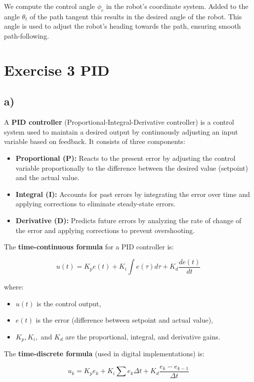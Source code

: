 \documentclass[template,12pt,a4paper,enabledeprecatedfontcommands]{template}
\begin{document}
We compute the control angle $\phi_c$ in the robot’s coordinate system. Added to the angle $\theta_t$ of the path tangent this results in the desired angle of the robot. This angle is used to adjust the robot's heading towards the path, ensuring smooth path-following.

\section{Exercise 3 PID}

\subsection*{a)}
A \textbf{PID controller} (Proportional-Integral-Derivative controller) is a control system used to maintain a desired output by continuously adjusting an input variable based on feedback. It consists of three components:

\begin{itemize}
    \item \textbf{Proportional (P):} Reacts to the present error by adjusting the control variable proportionally to the difference between the desired value (setpoint) and the actual value.
    \item \textbf{Integral (I):} Accounts for past errors by integrating the error over time and applying corrections to eliminate steady-state errors.
    \item \textbf{Derivative (D):} Predicts future errors by analyzing the rate of change of the error and applying corrections to prevent overshooting.
\end{itemize}

The \textbf{time-continuous formula} for a PID controller is:

\[
u(t) = K_p e(t) + K_i \int e(\tau) d\tau + K_d \frac{d e(t)}{dt}
\]

where:
\begin{itemize}
    \item \( u(t) \) is the control output,
    \item \( e(t) \) is the error (difference between setpoint and actual value),
    \item \( K_p, K_i, \) and \( K_d \) are the proportional, integral, and derivative gains.
\end{itemize}

The \textbf{time-discrete formula} (used in digital implementations) is:

\[
u_k = K_p e_k + K_i \sum e_k \Delta t + K_d \frac{e_k - e_{k-1}}{\Delta t}
\]
\end{document}
